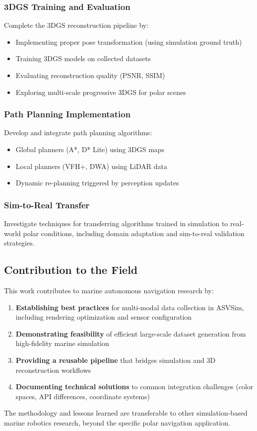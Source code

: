 \subsubsection{3DGS Training and Evaluation}

Complete the 3DGS reconstruction pipeline by:
\begin{itemize}
    \item Implementing proper pose transformation (using simulation ground truth)
    \item Training 3DGS models on collected datasets
    \item Evaluating reconstruction quality (PSNR, SSIM)
    \item Exploring multi-scale progressive 3DGS for polar scenes
\end{itemize}

\subsubsection{Path Planning Implementation}

Develop and integrate path planning algorithms:
\begin{itemize}
    \item Global planners (A*, D* Lite) using 3DGS maps
    \item Local planners (VFH+, DWA) using LiDAR data
    \item Dynamic re-planning triggered by perception updates
\end{itemize}

\subsubsection{Sim-to-Real Transfer}

Investigate techniques for transferring algorithms trained in simulation to real-world polar conditions, including domain adaptation and sim-to-real validation strategies.

\subsection{Contribution to the Field}

This work contributes to marine autonomous navigation research by:

\begin{enumerate}
    \item \textbf{Establishing best practices} for multi-modal data collection in ASVSim, including rendering optimization and sensor configuration

    \item \textbf{Demonstrating feasibility} of efficient large-scale dataset generation from high-fidelity marine simulation

    \item \textbf{Providing a reusable pipeline} that bridges simulation and 3D reconstruction workflows

    \item \textbf{Documenting technical solutions} to common integration challenges (color spaces, API differences, coordinate systems)
\end{enumerate}

The methodology and lessons learned are transferable to other simulation-based marine robotics research, beyond the specific polar navigation application.
